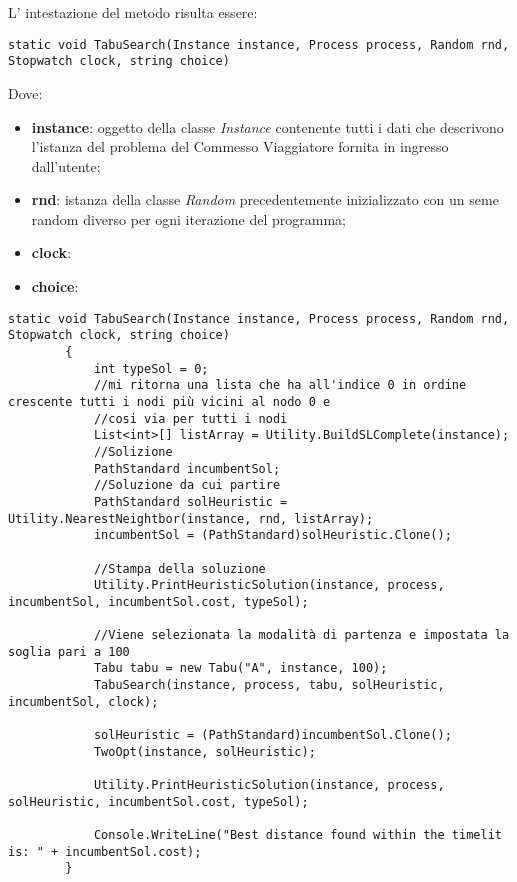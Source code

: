 L' intestazione del metodo risulta essere:

\begin{lstlisting}
static void TabuSearch(Instance instance, Process process, Random rnd, Stopwatch clock, string choice)
\end{lstlisting}

Dove:

\begin{itemize}
    \item \textbf{instance}: oggetto della classe \textit{Instance} contenente tutti i dati che descrivono l'istanza del problema del Commesso Viaggiatore fornita in ingresso dall'utente;
    \item \textbf{rnd}: istanza della classe \textit{Random} precedentemente inizializzato con un seme random diverso per ogni iterazione del programma;
    \item \textbf{clock}:
    \item \textbf{choice}:
\end{itemize}

\begin{lstlisting}
static void TabuSearch(Instance instance, Process process, Random rnd, Stopwatch clock, string choice)
        {
            int typeSol = 0;
			//mi ritorna una lista che ha all'indice 0 in ordine crescente tutti i nodi più vicini al nodo 0 e 
            //cosi via per tutti i nodi            
            List<int>[] listArray = Utility.BuildSLComplete(instance);
            //Solizione 
            PathStandard incumbentSol;
            //Soluzione da cui partire
            PathStandard solHeuristic = Utility.NearestNeightbor(instance, rnd, listArray);
            incumbentSol = (PathStandard)solHeuristic.Clone();
            
            //Stampa della soluzione
            Utility.PrintHeuristicSolution(instance, process, incumbentSol, incumbentSol.cost, typeSol);

            //Viene selezionata la modalità di partenza e impostata la soglia pari a 100
            Tabu tabu = new Tabu("A", instance, 100);
            TabuSearch(instance, process, tabu, solHeuristic, incumbentSol, clock);

            solHeuristic = (PathStandard)incumbentSol.Clone();
            TwoOpt(instance, solHeuristic);

            Utility.PrintHeuristicSolution(instance, process, solHeuristic, incumbentSol.cost, typeSol);

            Console.WriteLine("Best distance found within the timelit is: " + incumbentSol.cost);
        }
\end{lstlisting}

